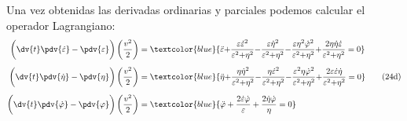 Una vez obtenidas las derivadas ordinarias y parciales podemos calcular el operador Lagrangiano:
\begin{align}
\begin{aligned}
\bigg( \dv{t} \pdv{\dot{\varepsilon}} - \pdv{\varepsilon} \bigg) \left( \dfrac{v^{2}}{2} \right) &= \textcolor{blue}{\ddot{\varepsilon} {+} \dfrac{\varepsilon \dot{\varepsilon}^{2}}{\varepsilon^{2} {+} \eta^{2}} {-} \dfrac{\varepsilon \dot{\eta}^{2}}{\varepsilon^{2} {+} \eta^{2}} {-} \dfrac{\varepsilon \eta^{2} \dot{\varphi}^{2}}{\varepsilon^{2} {+} \eta^{2}} {+} \dfrac{2 \eta \dot{\eta} \dot{\varepsilon}}{\varepsilon^{2} {+} \eta^{2}} = 0} \\[0.5em]
\bigg( \dv{t} \pdv{\dot{\eta}} - \pdv{\eta} \bigg) \left( \dfrac{v^{2}}{2} \right) &= \textcolor{blue}{\ddot{\eta} {+} \dfrac{\eta \dot{\eta}^{2}}{\varepsilon^{2} {+} \eta^{2}} {-} \dfrac{\eta \dot{\varepsilon}^{2}}{\varepsilon^{2} {+} \eta^{2}} {-} \dfrac{\varepsilon^{2} \eta \dot{\varphi}^{2}}{\varepsilon^{2} {+} \eta^{2}} {+} \dfrac{2 \varepsilon \dot{\varepsilon} \dot{\eta}}{\varepsilon^{2} {+} \eta^{2}} = 0} \\[0.5em]
\bigg( \dv{t} \pdv{\dot{\varphi}} - \pdv{\varphi} \bigg) \left( \dfrac{v^{2}}{2} \right) &=  \textcolor{blue}{\ddot{\varphi} + \dfrac{2 \dot{\varepsilon} \dot{\varphi}}{\varepsilon} + \dfrac{2 \dot{\eta} \dot{\varphi}}{\eta} = 0}
\end{aligned}
\tag{24d} \label{eq:ecuacion_especial}
\end{align}

